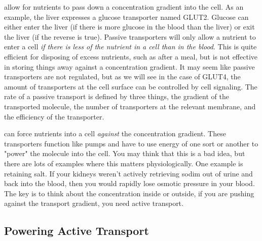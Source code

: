 \documentclass{tufte-handout}
\begin{document}
 allow for nutrients to pass down a concentration gradient into the cell.  As an example, the liver expresses a glucose transporter named GLUT2.  Glucose can either enter the liver (if there is more glucose in the blood than the liver) or exit the liver (if the reverse is true).  Passive transporters will only allow a nutrient to enter a cell \emph{if there is less of the nutrient in a cell than in the blood}.  This is quite efficient for disposing of excess nutrients, such as after a meal, but is not effective in storing things away against a concentration gradient.  It may seem like passive transporters are not regulated, but as we will see in the case of GLUT4, the amount of transporters at the cell surface can be controlled by cell signaling.  The rate of a passive transport is defined by three things, the gradient of the transported molecule, the number of transporters at the relevant membrane, and the efficiency of the transporter.

 can force nutrients into a cell \emph{against} the concentration gradient.  These transporters function like pumps and have to use energy of one sort or another to "power" the molecule into the cell.  You may think that this is a bad idea, but there are lots of examples where this matters physiologically.  One example is retaining salt.  If your kidneys weren't actively retrieving sodim out of urine and back into the blood, then you would rapidly lose osmotic pressure in your blood. The key is to think about the concentration inside or outside, if you are pushing against the transport gradient, you need active transport.

\subsection{Powering Active Transport}
\end{document}

